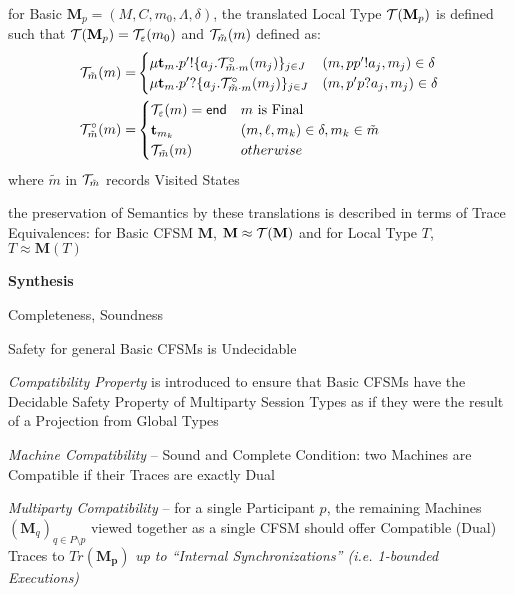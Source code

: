 for Basic $\mathbf{M}_p = (M,C,m_0,\Lambda,\delta)$, the translated
Local Type $\mathcal{T}(\mathbf{M}_p)$ is defined such that
$\mathcal{T}(\mathbf{M}_p) = \mathcal{T}_{\varepsilon}(m_0)$ and
$\mathcal{T}_{\tilde{m}}(m)$ defined as:
\begin{align*}
  \mathcal{T}_{\tilde{m}}(m) = &
    \begin{cases}
      \mu\mathbf{t}_m.p'!
        \{ a_j.\mathcal{T}^\circ_{\tilde{m} \cdot m}(m_j) \}_{j \in J}
        & (m,pp'!a_j,m_j) \in \delta \\
      \mu\mathbf{t}_m.p'?
        \{ a_j.\mathcal{T}^\circ_{\tilde{m} \cdot m}(m_j) \}_{j \in J}
        & (m,p'p?a_j,m_j) \in \delta
    \end{cases} \\
  \mathcal{T}^\circ_{\tilde{m}}(m) = &
    \begin{cases}
      \mathcal{T}_\varepsilon(m) = \mathsf{end} & m\ \text{is Final} \\
      \mathbf{t}_{m_k} & (m,\ell,m_k) \in \delta, m_k \in \tilde{m} \\
      \mathcal{T}_{\tilde{m}}(m) & otherwise
    \end{cases}
\end{align*}
where $\tilde{m}$ in $\mathcal{T}_{\tilde{m}}$ records Visited States

the preservation of Semantics by these translations is described in
terms of Trace Equivalences: for Basic CFSM $\mathbf{M}$, $\mathbf{M}
\approx \mathcal{T}(\mathbf{M})$ and for Local Type $T$, $T \approx
\mathbf{M}(T)$


\textbf{Synthesis}

Completeness, Soundness

Safety for general Basic CFSMs is Undecidable

\emph{Compatibility Property} is introduced to ensure that Basic CFSMs
have the Decidable Safety Property of Multiparty Session Types as if
they were the result of a Projection from Global Types

\emph{Machine Compatibility} -- Sound and Complete Condition: two
Machines are Compatible if their Traces are exactly Dual

\emph{Multiparty Compatibility} -- for a single Participant $p$, the
remaining Machines $(\mathbf{M}_q)_{q \in P \setminus p}$ viewed
together as a single CFSM should offer Compatible (Dual) Traces to
$Tr(\mathbf{M_p})$ \emph{up to ``Internal Synchronizations'' (i.e.
  1-bounded Executions)} %

